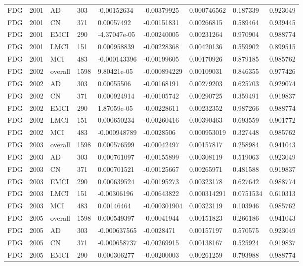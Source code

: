 \begin{landscape}
\begin{longtable}{lllllllll}
FDG & 2001 & AD & 303 & -0.00152634 & -0.00379925 & 0.000746562 & 0.187339 & 0.923049 \\
FDG & 2001 & CN & 371 & 0.00057492 & -0.00151831 & 0.00266815 & 0.589464 & 0.939445 \\
FDG & 2001 & EMCI & 290 & -4.37047e-05 & -0.00240005 & 0.00231264 & 0.970904 & 0.988774 \\
FDG & 2001 & LMCI & 151 & 0.000958839 & -0.00228368 & 0.00420136 & 0.559902 & 0.899515 \\
FDG & 2001 & MCI & 483 & -0.000143396 & -0.00199605 & 0.00170926 & 0.879185 & 0.985762 \\
FDG & 2002 & overall & 1598 & 9.80421e-05 & -0.000894229 & 0.00109031 & 0.846355 & 0.977426 \\
FDG & 2002 & AD & 303 & 0.00055506 & -0.00168191 & 0.00279203 & 0.625703 & 0.929074 \\
FDG & 2002 & CN & 371 & 0.000924914 & -0.00105742 & 0.00290725 & 0.359491 & 0.919837 \\
FDG & 2002 & EMCI & 290 & 1.87059e-05 & -0.00228611 & 0.00232352 & 0.987266 & 0.988774 \\
FDG & 2002 & LMCI & 151 & 0.000650234 & -0.00260416 & 0.00390463 & 0.693559 & 0.901772 \\
FDG & 2002 & MCI & 483 & -0.000948789 & -0.0028506 & 0.000953019 & 0.327448 & 0.985762 \\
FDG & 2003 & overall & 1598 & 0.000576599 & -0.00042497 & 0.00157817 & 0.258984 & 0.941043 \\
FDG & 2003 & AD & 303 & 0.000761097 & -0.00155899 & 0.00308119 & 0.519063 & 0.923049 \\
FDG & 2003 & CN & 371 & 0.000701521 & -0.00125667 & 0.00265971 & 0.481588 & 0.919837 \\
FDG & 2003 & EMCI & 290 & 0.000639524 & -0.00195273 & 0.00323178 & 0.627642 & 0.988774 \\
FDG & 2003 & LMCI & 151 & -0.00306196 & -0.00643822 & 0.000314291 & 0.0751534 & 0.610313 \\
FDG & 2003 & MCI & 483 & 0.00146464 & -0.000301904 & 0.00323119 & 0.103946 & 0.985762 \\
FDG & 2005 & overall & 1598 & 0.000549397 & -0.00041944 & 0.00151823 & 0.266186 & 0.941043 \\
FDG & 2005 & AD & 303 & -0.000637565 & -0.0028471 & 0.00157197 & 0.570575 & 0.923049 \\
FDG & 2005 & CN & 371 & -0.000658737 & -0.00269915 & 0.00138167 & 0.525924 & 0.919837 \\
FDG & 2005 & EMCI & 290 & 0.000306277 & -0.00200003 & 0.00261259 & 0.793988 & 0.988774 \\

\end{longtable}
\end{landscape}
